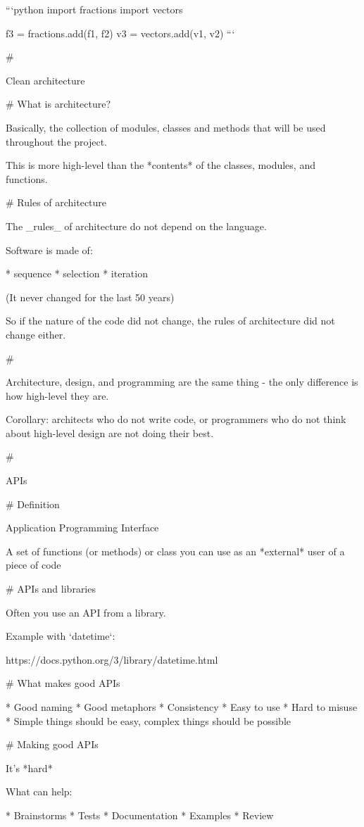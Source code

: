 ```python
import fractions
import vectors

f3 = fractions.add(f1, f2)
v3 = vectors.add(v1, v2)
```

#

\huge \center Clean architecture

# What is architecture?

Basically, the collection of modules, classes and methods that will
be used throughout the project.

This is more high-level than the *contents* of the classes, modules, and functions.


# Rules of architecture

The _rules_ of architecture do not depend on the language.

Software is made of:

* sequence
* selection
* iteration

(It never changed for the last 50 years)

So if the nature of the code did not change, the rules of architecture did
not change either.

#

Architecture, design, and programming are the same thing - the only difference
is how high-level they are.

Corollary: architects who do not write code, or programmers who do not think about
high-level design are not doing their best.

#

\huge \center APIs


# Definition

Application Programming Interface

A set of functions (or methods) or class you can use
as an *external* user of a piece of code

# APIs and libraries

Often you use an API from a library.

Example with `datetime`:

https://docs.python.org/3/library/datetime.html

# What makes good APIs

* Good naming
* Good metaphors
* Consistency
* Easy to use
* Hard to misuse
* Simple things should be easy, complex things should be possible

# Making good APIs

It's *hard*

What can help:

* Brainstorms
* Tests
* Documentation
* Examples
* Review

